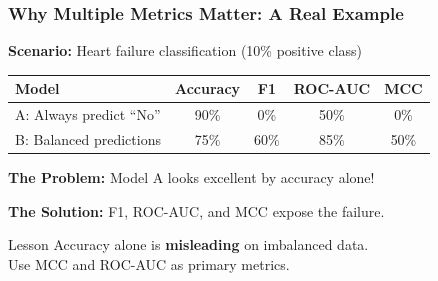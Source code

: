 \documentclass{beamer}
\begin{document}
\begin{frame}[fragile]
\frametitle{Why Multiple Metrics Matter: A Real Example}

\textbf{Scenario:} Heart failure classification (10\% positive class)

\vspace{0.3cm}
\begin{center}
{\small
\begin{tabular}{|l|c|c|c|c|}
\hline
\textbf{Model} & \textbf{Accuracy} & \textbf{F1} & \textbf{ROC-AUC} & \textbf{MCC} \\
\hline
A: Always predict ``No'' & 90\% & 0\% & 50\% & 0\% \\
\hline
B: Balanced predictions & 75\% & 60\% & 85\% & 50\% \\
\hline
\end{tabular}
}
\end{center}

\vspace{0.4cm}
\textbf{The Problem:} Model A looks excellent by accuracy alone!

\vspace{0.2cm}
\textbf{The Solution:} F1, ROC-AUC, and MCC expose the failure.

\vspace{0.3cm}
\begin{alertblock}{Lesson}
Accuracy alone is \textbf{misleading} on imbalanced data. \\
Use MCC and ROC-AUC as primary metrics.
\end{alertblock}

\end{frame}
\end{document}
